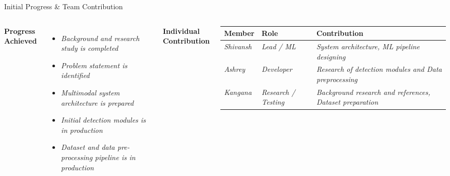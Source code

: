 \documentclass[aspectratio=169,11pt]{beamer}
\newcommand{\placeholder}[1]{\textit{\color{GEUGrey}#1}}
\begin{document}
\begin{frame}{Initial Progress \& Team Contribution}

\begin{columns}[T,totalwidth=\textwidth]


\textbf{\color{GEUBlue}Progress Achieved}

\begin{itemize}\itemsep3pt
\item \placeholder{Background and research study is  completed}
\item \placeholder{Problem statement is identified}
\item \placeholder{Multimodal system architecture is  prepared}
\item \placeholder{Initial detection modules is in production}
\item \placeholder{Dataset and data pre-processing pipeline is in production}
\end{itemize}


\textbf{\color{GEUBlue}Individual Contribution}

\vspace{2mm}

\scriptsize
\begin{tabularx}{\textwidth}{@{}p{1.8cm}p{2.0cm}X@{}}
\toprule
Member & Role & Contribution\\
\midrule
\placeholder{Shivansh} & \placeholder{Lead / ML} &
\placeholder{System architecture, ML pipeline designing}\\
\placeholder{Ashrey} & \placeholder{Developer} &
\placeholder{Research of detection modules and Data preprocessing}\\
\placeholder{Kangana} & \placeholder{Research / Testing} &
\placeholder{Background research and references, Dataset preparation }\\
\bottomrule
\end{tabularx}

\end{columns}

\end{frame}
\end{document}
